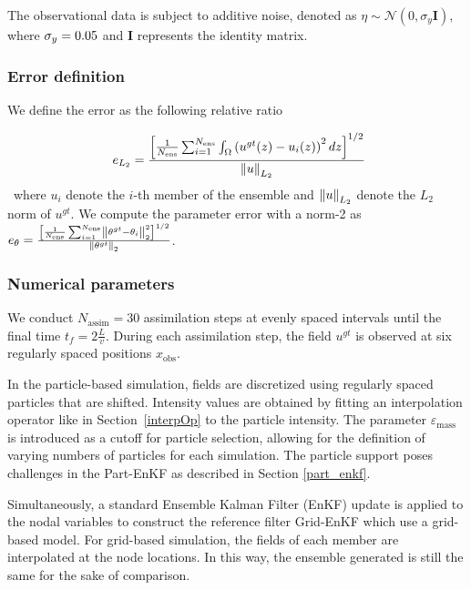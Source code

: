 The observational data is subject to additive noise, denoted as $\eta \sim \mathcal{N}(0, \sigma_y \bm{I})$, where $\sigma_y = 0.05$ and $\bm{I}$ represents the identity matrix.

\subsubsection{Error definition}
We define the error as the following relative ratio

\begin{equation}~\label{eq:L2_error}
	e_{L_2} =\frac{ \left[\frac1{N_{\text{ens}}} \sum_{i = 1}^{N_{\text{ens}}} \int_\Omega \left(u^{gt}(z) - u_i(z)\right)^2 dz\right]^{1/2}}{\left\lVert u \right\rVert_{L_2}}
\end{equation}~where $u_i$ denote the $i$-th member of the ensemble and $\left\lVert u \right\rVert_{L_2}$ denote the $L_2$ norm of $u^{gt}$. We compute the parameter error with a norm-2 as $e_{\theta} = \frac{ \left[\frac1{N_{\text{ens}}} \sum_{i = 1}^{N_{\text{ens}}} \left\lVert \theta^{gt} - \theta_{i} \right\rVert_2^2\right]^{1/2}}{\left\lVert \theta^{gt} \right\rVert_2}$.


\subsubsection{Numerical parameters}

We conduct $N_{\text{assim}} = 30$ assimilation steps at evenly spaced intervals until the final time $t_f = 2 \frac{L}{v}$. During each assimilation step, the field $u^{gt}$ is observed at six regularly spaced positions $x_{\text{obs}}$.


In the particle-based simulation, fields are discretized using regularly spaced particles that are shifted. Intensity values are obtained by fitting an interpolation operator like in Section~\ref{interpOp} to the particle intensity.
The parameter $\varepsilon_{\text{mass}}$ is introduced as a cutoff for particle selection, allowing for the definition of varying numbers of particles for each simulation. The particle support poses challenges in the Part-EnKF as described in Section \ref{part_enkf}.

Simultaneously, a standard Ensemble Kalman Filter (EnKF) update is applied to the nodal variables to construct the reference filter Grid-EnKF which use a grid-based model. For grid-based simulation, the fields of each member are interpolated at the node locations. In this way, the ensemble generated is still the same for the sake of comparison.


